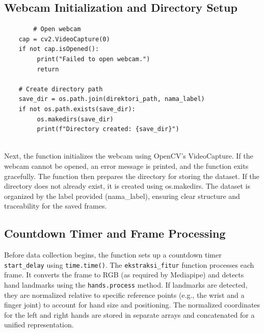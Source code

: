 \subsection{Webcam Initialization and Directory Setup}
\begin{lstlisting}
	    # Open webcam
	cap = cv2.VideoCapture(0)
	if not cap.isOpened():
	     print("Failed to open webcam.")
	     return
	
	# Create directory path
	save_dir = os.path.join(direktori_path, nama_label)
	if not os.path.exists(save_dir):
	     os.makedirs(save_dir)
	     print(f"Directory created: {save_dir}")
	
\end{lstlisting}
Next, the function initializes the webcam using OpenCV’s VideoCapture. If the webcam cannot be opened, an error message is printed, and the function exits gracefully. The function then prepares the directory for storing the dataset. If the directory does not already exist, it is created using os.makedirs. The dataset is organized by the label provided (nama\_label), ensuring clear structure and traceability for the saved frames.

\subsection{Countdown Timer and Frame Processing}
Before data collection begins, the function sets up a countdown timer \verb|start_delay| using \verb|time.time()|. The \verb|ekstraksi_fitur| function processes each frame. It converts the frame to RGB (as required by Mediapipe) and detects hand landmarks using the \verb|hands.process| method. If landmarks are detected, they are normalized relative to specific reference points (e.g., the wrist and a finger joint) to account for hand size and positioning. The normalized coordinates for the left and right hands are stored in separate arrays and concatenated for a unified representation.\\

